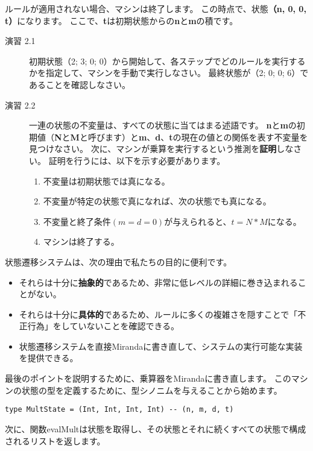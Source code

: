 \documentclass{jarticle}
\begin{document}
ルールが適用されない場合、マシンは終了します。
この時点で、状態\textbf{（n, 0, 0, t）}になります。
ここで、\textbf{t}は初期状態からの\textbf{n}と\textbf{m}の積です。

\begin{description}
	\item[演習 2.1] 初期状態（2; 3; 0; 0）から開始して、各ステップでどのルールを実行するかを指定して、マシンを手動で実行しなさい。
		最終状態が（2; 0; 0; 6）であることを確認しなさい。
	\item[演習 2.2] 一連の状態の不変量は、すべての状態に当てはまる述語です。
		\textbf{n}と\textbf{m}の初期値（\textbf{N}と\textbf{M}と呼びます）と\textbf{m}、\textbf{d}、\textbf{t}の現在の値との関係を表す不変量を見つけなさい。
		次に、マシンが乗算を実行するという推測を\textbf{証明}しなさい。
		証明を行うには、以下を示す必要があります。
		\begin{enumerate}
			\item 不変量は初期状態では真になる。
			\item 不変量が特定の状態で真になれば、次の状態でも真になる。
			\item 不変量と終了条件$(m = d = 0)$が与えられると、$t = N * M$になる。
			\item マシンは終了する。
		\end{enumerate}
\end{description}

状態遷移システムは、次の理由で私たちの目的に便利です。

\begin{itemize}
	\item それらは十分に\textbf{抽象的}であるため、非常に低レベルの詳細に巻き込まれることがない。
	\item それらは十分に\textbf{具体的}であるため、ルールに多くの複雑さを隠すことで「不正行為」をしていないことを確認できる。
	\item 状態遷移システムを直接Mirandaに書き直して、システムの実行可能な実装を提供できる。
\end{itemize}

最後のポイントを説明するために、乗算器をMirandaに書き直します。
このマシンの状態の型を定義するために、型シノニムを与えることから始めます。

\begin{verbatim}
type MultState = (Int, Int, Int, Int) -- (n, m, d, t)
\end{verbatim}

次に、関数evalMultは状態を取得し、その状態とそれに続くすべての状態で構成されるリストを返します。
\end{document}
